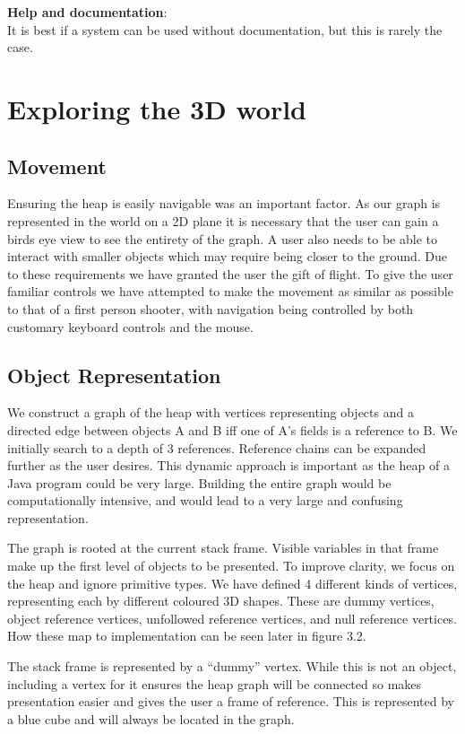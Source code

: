 \documentclass[11pt, a4paper]{report}
\begin{document}
{\bfseries Help and documentation}: \\
It is best if a system can be used without documentation, but this is rarely the case.

\section{Exploring the 3D world}

\subsection{Movement}

Ensuring the heap is easily navigable was an important factor. As our graph is represented in the world on a 2D plane it is necessary that the user can gain a birds eye view to see the entirety of the graph. A user also needs to be able to interact with smaller objects which may require being closer to the ground. Due to these requirements we have granted the user the gift of flight. To give the user familiar controls we have attempted to make the movement as similar as possible to that of a first person shooter, with navigation being controlled by both customary keyboard controls and the mouse. 

\subsection{Object Representation}

We construct a graph of the heap with vertices representing objects and a directed edge between objects A and B iff one of A’s fields is a reference to B. We initially search to a depth of 3 references. Reference chains can be expanded further as the user desires. This dynamic approach is important as the heap of a Java program could be very large. Building the entire graph would be computationally intensive, and would lead to a very large and confusing representation.

The graph is rooted at the current stack frame. Visible variables in that frame make up the first level of objects to be presented. To improve clarity, we focus on the heap and ignore primitive types. We have defined 4 different kinds of vertices, representing each by different coloured 3D shapes. These are dummy vertices, object reference vertices, unfollowed reference vertices, and null reference vertices. How these map to implementation can be seen later in figure 3.2.

The stack frame is represented by a “dummy” vertex. While this is not an object, including a vertex for it ensures the heap graph will be connected so makes presentation easier and gives the user a frame of reference. This is represented by a blue cube and will always be located in the graph.
\end{document}
